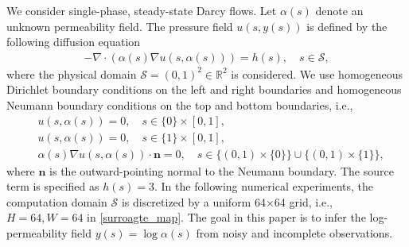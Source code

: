 We consider single-phase, steady-state Darcy flows. Let $\alpha(s)$ denote an unknown permeability field. The pressure field $u(s,y(s))$ is defined by the following diffusion equation
\begin{align}\label{diffusion}
    -\nabla \cdot\left(\alpha(s)\nabla u(s,\alpha(s))\right)=h(s),\quad s\in \mathcal{S},
\end{align}
where the physical domain $\mathcal{S}=(0,1)^2\in\mathbb{R}^2$ is considered. We use homogeneous Dirichlet boundary conditions on the left and right boundaries and homogeneous Neumann boundary conditions on the top
and bottom boundaries, i.e.,
\begin{align*}
    &u(s,\alpha(s))=0,\quad s\in  \{0\} \times [0, 1],\\
     &u(s,\alpha(s))=0,\quad s\in  \{1\} \times [0, 1],\\
    &\alpha(s)\nabla u(s,\alpha(s))\cdot \mathbf{n}=0,\quad s\in \{(0, 1) \times \{0\}\} \cup \{(0, 1) \times \{1\}\},
\end{align*}
where $\mathbf{n}$ is the outward-pointing normal to the Neumann boundary. The source term is specified as $h(s)=3$.
In the following numerical experiments, the computation domain $\mathcal{S}$ is discretized by a uniform 64×64 grid, i.e., $H=64,W=64$ in \eqref{surroagte_map}. The goal in this paper is to infer the log-permeability field $y(s)=\log \alpha(s)$ from noisy and incomplete observations.


